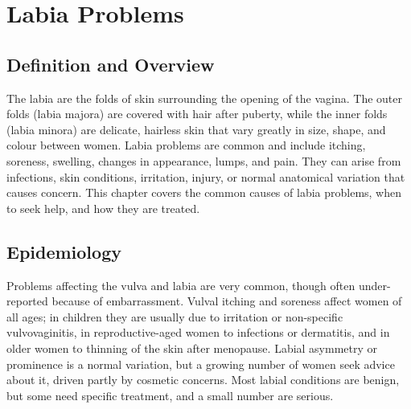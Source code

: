 \chapter{Labia Problems}

\section*{Definition and Overview}
The labia are the folds of skin surrounding the opening of the vagina. The outer folds (labia majora) are covered with hair after puberty, while the inner folds (labia minora) are delicate, hairless skin that vary greatly in size, shape, and colour between women. Labia problems are common and include itching, soreness, swelling, changes in appearance, lumps, and pain. They can arise from infections, skin conditions, irritation, injury, or normal anatomical variation that causes concern. This chapter covers the common causes of labia problems, when to seek help, and how they are treated.

\section*{Epidemiology}
Problems affecting the vulva and labia are very common, though often under-reported because of embarrassment. Vulval itching and soreness affect women of all ages; in children they are usually due to irritation or non-specific vulvovaginitis, in reproductive-aged women to infections or dermatitis, and in older women to thinning of the skin after menopause. Labial asymmetry or prominence is a normal variation, but a growing number of women seek advice about it, driven partly by cosmetic concerns. Most labial conditions are benign, but some need specific treatment, and a small number are serious.

